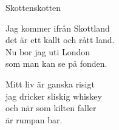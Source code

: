 \begin{song}{Skotten}{skotten}
\begin{vers}
Jag kommer ifrån Skottland\\
det är ett kallt och rått land.\\
Nu bor jag uti London\\
som man kan se på fonden.\\
\end{vers}
\begin{vers}
Mitt liv är ganska risigt\\
jag dricker sliskig whiskey\\
och när som kilten faller\\
är rumpan bar.\\
\end{vers}
\end{song}
